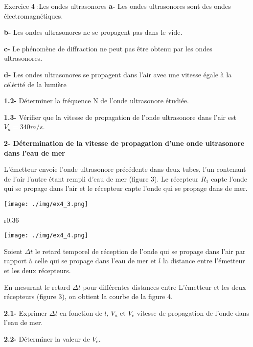 \documentclass[12pt, french]{article}
\begin{document}
\begin{Box2}{Exercice 4 :Les ondes ultrasonores }
\textbf{a- }Les ondes ultrasonores sont des ondes
électromagnétiques.

\textbf{b- }Les ondes ultrasonores ne se propagent pas dans le vide.

\textbf{c- }Le phénomène de diffraction ne peut pas être obtenu par les ondes ultrasonores.

\textbf{d- }Les ondes ultrasonores se propagent dans l’air avec une vitesse égale à la célérité de la lumière

\textbf{1.2- }Déterminer la fréquence N de l’onde ultrasonore étudiée.

\textbf{1.3- }Vérifier que la vitesse de propagation de l’onde ultrasonore dans l’air est $V_a = 340 m/s$.

\textbf{2- Détermination de la vitesse de propagation d’une onde ultrasonore dans l’eau de mer\dotfill}

L’émetteur envoie l’onde ultrasonore précédente dans deux tubes, l’un contenant de l’air l’autre étant
rempli d’eau de mer (figure 3). Le récepteur $R_1$ capte l’onde qui se propage dans l’air et le récepteur capte l’onde qui se propage dans de mer.
  \begin{center}
	  \vspace{-0.3cm}
	\texttt{[image: ./img/ex4\_3.png]}
	  \vspace{-0.4cm}
  \end{center}

\begin{wrapfigure}{r}{0.36\textwidth}
  \begin{center}
	  \vspace{-0.8cm}
	\texttt{[image: ./img/ex4\_4.png]}
  \end{center}
\end{wrapfigure}


Soient $\Delta{t}$ le retard temporel de réception de l’onde qui se
propage dans l’air par rapport à celle qui se propage dans l’eau
de mer et $l$ la distance entre l’émetteur et les deux récepteurs.

En mesurant le retard $\Delta{t}$ pour différentes distances entre
L’émetteur et les deux récepteurs (figure 3), on obtient la
courbe de la figure 4.

\textbf{2.1- }Exprimer $\Delta{t}$ en fonction de $l$, $V_a$ et $V_e$ vitesse de
propagation de l’onde dans l’eau de mer.

\textbf{2.2- }Déterminer la valeur de $V_e$.
\end{Box2}
\end{document}
